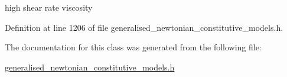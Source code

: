 high shear rate viscosity 



Definition at line 1206 of file generalised\+\_\+newtonian\+\_\+constitutive\+\_\+models.\+h.



The documentation for this class was generated from the following file\+:\begin{DoxyCompactItemize}
\item 
\hyperlink{generalised__newtonian__constitutive__models_8h}{generalised\+\_\+newtonian\+\_\+constitutive\+\_\+models.\+h}\end{DoxyCompactItemize}
